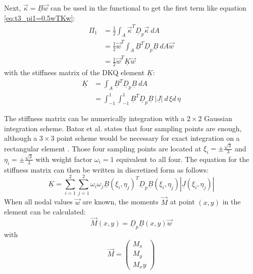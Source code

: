   Next, $\vec{\kappa} = \underline{B} \vec{w}$ can be used in the functional to get the first term like equation \ref{eq:t3_pi1=0.5wTKw}:
  \begin{align}
  \Pi_1 &= \frac{1}{2} \int_A \vec{\kappa}^T \underline{D}_p \vec{\kappa}\ d\!A \nonumber\\
  &= \frac{1}{2} \vec{w}^T \int_A \underline{B}^T \underline{D}_p \underline{B}\ d\!A \vec{w}\nonumber\\
  &= \frac{1}{2} \vec{w}^T \underline{K} \vec{w} \nonumber
  \end{align}
  with the stiffness matrix of the DKQ element $\underline{K}$:
  \begin{align}
  \underline{K} &= \int_A \underline{B}^T \underline{D}_p \underline{B}\ d\!A \nonumber\\
  &= \int_{-1}^{1} \int_{-1}^{1} \underline{B}^T \underline{D}_p \underline{B}\ \left|\underline{J}\right|\ d\,\!\xi d\,\!\eta
  \end{align}
  
  The stiffness matrix can be numerically integration with a $2\!\times\!2$ Gaussian integration scheme. Batoz et al. states that four sampling points are enough, although a $3\!\times\!3$ point scheme would be necessary for exact integration on a rectangular element \cite{batoz1982evaluation}. Those four sampling points are located at $\xi_i = \pm \frac{\sqrt{3}}{3}$ and $\eta_i = \pm \frac{\sqrt{3}}{3}$ with weight factor $\omega_i = 1$ equivalent to all four. The equation for the stiffness matrix can then be written in discretized form as follows:
  \begin{equation}
  \underline{K} = \sum_{i=1}^{2} \sum_{j=1}^{2} \omega_i \omega_j \underline{B}(\xi_i,\eta_j)^T \underline{D}_p \underline{B}(\xi_i,\eta_j) \left|\underline{J}(\xi_i,\eta_j)\right|
  \end{equation}
  When all nodal values $\vec{w}$ are known, the moments $\vec{M}$ at point $(x,y)$ in the element can be calculated:
  \begin{equation}
  \vec{M}(x,y) = \underline{D}_p \underline{B}(x,y) \vec{w}
  \end{equation}
  with
  \begin{equation}
  \vec{M} = \begin{pmatrix}
  M_x\\M_y\\M_xy
  \end{pmatrix}
  \end{equation}
 
